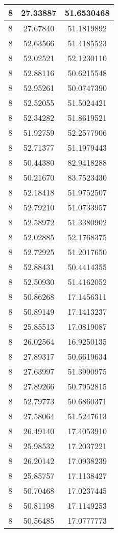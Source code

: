 \documentclass[
]{book}
\begin{document}
\begin{tabular}{c|c|c}
\hline
8 & 27.33887 & 51.6530468\\
\hline
8 & 27.67840 & 51.1819892\\
\hline
8 & 52.63566 & 51.4185523\\
\hline
8 & 52.02521 & 52.1230110\\
\hline
8 & 52.88116 & 50.6215548\\
\hline
8 & 52.95261 & 50.0747390\\
\hline
8 & 52.52055 & 51.5024421\\
\hline
8 & 52.34282 & 51.8619521\\
\hline
8 & 51.92759 & 52.2577906\\
\hline
8 & 52.71377 & 51.1979443\\
\hline
8 & 50.44380 & 82.9418288\\
\hline
8 & 50.21670 & 83.7523430\\
\hline
8 & 52.18418 & 51.9752507\\
\hline
8 & 52.79210 & 51.0733957\\
\hline
8 & 52.58972 & 51.3380902\\
\hline
8 & 52.02885 & 52.1768375\\
\hline
8 & 52.72925 & 51.2017650\\
\hline
8 & 52.88431 & 50.4414355\\
\hline
8 & 52.50930 & 51.4162052\\
\hline
8 & 50.86268 & 17.1456311\\
\hline
8 & 50.89149 & 17.1413237\\
\hline
8 & 25.85513 & 17.0819087\\
\hline
8 & 26.02564 & 16.9250135\\
\hline
8 & 27.89317 & 50.6619634\\
\hline
8 & 27.63997 & 51.3990975\\
\hline
8 & 27.89266 & 50.7952815\\
\hline
8 & 52.79773 & 50.6860371\\
\hline
8 & 27.58064 & 51.5247613\\
\hline
8 & 26.49140 & 17.4053910\\
\hline
8 & 25.98532 & 17.2037221\\
\hline
8 & 26.20142 & 17.0938239\\
\hline
8 & 25.85757 & 17.1138427\\
\hline
8 & 50.70468 & 17.0237445\\
\hline
8 & 50.81198 & 17.1149253\\
\hline
8 & 50.56485 & 17.0777773\\

\end{tabular}
\end{document}
